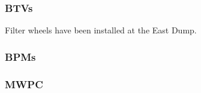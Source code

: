 \subsubsection{BTVs}
Filter wheels have been installed at the East Dump.
\subsubsection{BPMs}
\subsubsection{MWPC}